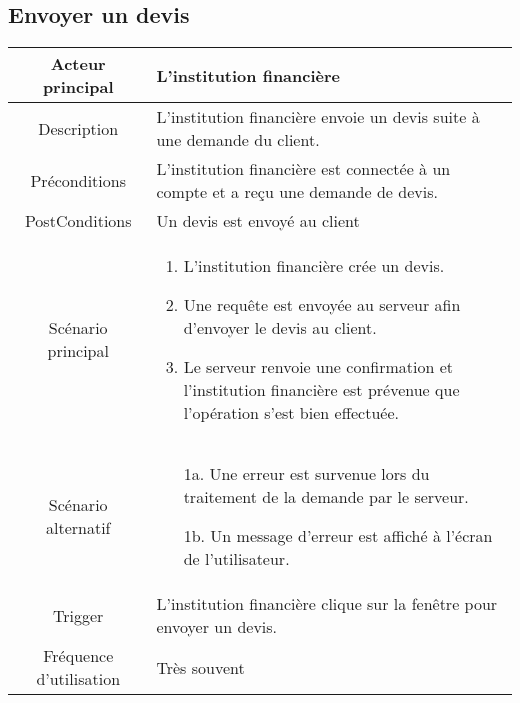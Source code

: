 \documentclass[]{article}
\begin{document}
\subsection{Envoyer un devis}
\begin{table}[h]
    \begin{tabular}{|c|p{10cm}|}
       \hline
       Acteur principal&L'institution financière\\
       \hline
       Description&L'institution financière envoie un devis suite à une demande du client.\\
       \hline
       Préconditions&L'institution financière est connectée à un compte et a reçu une demande de devis.\\
       \hline
       PostConditions&Un devis est envoyé au client\\
       \hline
       Scénario principal& 
             \begin{enumerate}
                \item L'institution financière crée un devis.
                \item Une requête est envoyée au serveur afin d'envoyer le devis au client.
                \item Le serveur renvoie une confirmation et l'institution financière est prévenue que l'opération s'est bien effectuée.
             \end{enumerate}     \\
       \hline
       Scénario alternatif&    
       \begin{itemize}
        \item[1a.] Une erreur est survenue lors du traitement de la demande par le serveur.
        \item[1b.] Un message d'erreur est affiché à l'écran de l'utilisateur. 
        \end{itemize}
       \\
       \hline
       Trigger&L'institution financière clique sur la fenêtre pour envoyer un devis.\\
       \hline
       Fréquence d'utilisation&Très souvent\\
       \hline
    \end{tabular}
 \end{table}
\end{document}
